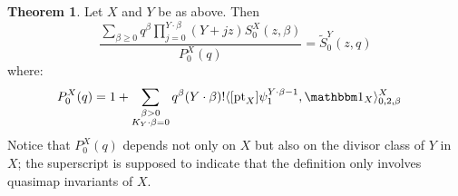 \documentclass[11pt]{amsart}
\newcommand{\pt}{\operatorname{pt}}
\theoremstyle{definition}
\newtheorem{thm}{Theorem}[section]
\theoremstyle{definition}
\begin{document}
\begin{thm} \label{Theorem Quantum Lefschetz}
Let $X$ and $Y$ be as above. Then
\begin{equation}\label{eqn:mirror}
\dfrac{\sum_{\beta\geq 0} q^\beta\prod_{j=0}^{Y\cdot\beta}(Y+jz)S_0^X(z,\beta)}{P_0^X(q)}= \tilde{S}_0^Y(z,q)
\end{equation}
where:
\begin{align*}
 P_0^X(q) %
            & = 1 + \sum_{\substack{\beta>0 \\ K_Y\cdot\beta=0}} q^\beta(Y\cdot\beta)!\langle [\pt_X] \psi_1^{Y\cdot\beta-1} ,\mathbbm 1_{X}\rangle_{0,2,\beta}^X
\end{align*}
Notice that $P_0^X(q)$ depends not only on $X$ but also on the divisor class of $Y$ in~$X$; the superscript is supposed to indicate that the definition only involves quasimap invariants of $X$.
\end{thm}
\end{document}
